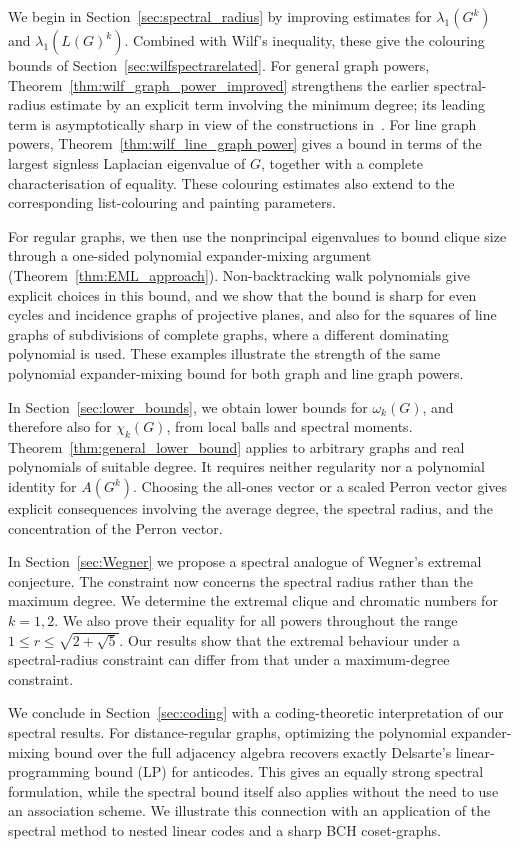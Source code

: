 \documentclass[10pt,a4paper]{article}
\theoremstyle{plain}
\numberwithin{equation}{section}
\begin{document}
 
We begin in Section~\ref{sec:spectral_radius} by improving estimates for $\lambda_1(G^k)$ and $\lambda_1(L(G)^k)$. Combined with Wilf's inequality, these give the colouring bounds of Section~\ref{sec:wilfspectrarelated}. For general graph powers, Theorem~\ref{thm:wilf_graph_power_improved} strengthens the earlier spectral-radius estimate by an explicit term involving the minimum degree; its leading term is asymptotically sharp in view of the constructions in~\cite{vanBatenburg_Korsky_2026}. For line graph powers, Theorem~\ref{thm:wilf_line_graph power} gives a bound in terms of the largest signless Laplacian eigenvalue of $G$, together with a complete characterisation of equality. These colouring estimates also extend to the corresponding list-colouring and painting parameters.

For regular graphs, we then use the nonprincipal eigenvalues to bound clique size through a one-sided polynomial expander-mixing argument (Theorem~\ref{thm:EML_approach}). Non-backtracking walk polynomials give explicit choices in this bound, and we show that the bound is sharp for even cycles and incidence graphs of projective planes, and also for the squares of line graphs of subdivisions of complete graphs, where a different dominating polynomial is used. These examples illustrate the strength of the same polynomial expander-mixing bound for both graph and line graph powers.

In Section~\ref{sec:lower_bounds}, we obtain lower bounds for $\omega_k(G)$, and therefore also for $\chi_k(G)$, from local balls and spectral moments. Theorem~\ref{thm:general_lower_bound} applies to arbitrary graphs and real polynomials of suitable degree. It requires neither regularity nor a polynomial identity for $A(G^k)$. Choosing the all-ones vector or a scaled Perron vector gives explicit consequences involving the average degree, the spectral radius, and the concentration of the Perron vector.

In Section~\ref{sec:Wegner} we propose a spectral analogue of Wegner's extremal conjecture. The constraint now concerns the spectral radius rather than the maximum degree. We determine the extremal clique and chromatic numbers for $k=1,2$. We also prove their equality for all powers throughout the range $1\leq r\leq\sqrt{2+\sqrt{5}}$. Our results show that the extremal behaviour under a spectral-radius constraint can differ from that under a maximum-degree constraint.

We conclude in Section~\ref{sec:coding} with a coding-theoretic interpretation of our spectral results. For distance-regular graphs, optimizing the polynomial expander-mixing bound over the full adjacency algebra recovers exactly Delsarte's linear-programming bound (LP) for anticodes. This gives an equally strong spectral formulation, while the spectral bound itself also applies without the need to use an association scheme. We illustrate this connection with an application of the spectral method to nested linear codes and a sharp BCH coset-graphs.
\end{document}
